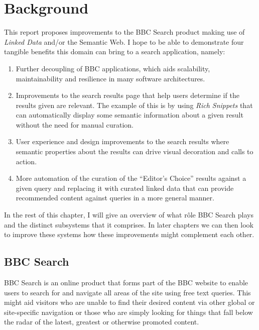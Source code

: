 \chapter{Background}
\label{intro}

This report proposes improvements to the BBC Search product making use
of \emph{Linked Data}\cite{bizer2009linked} and/or the Semantic
Web\cite{berners2001semantic}. I hope to be able to demonstrate four tangible
benefits this domain can bring to a search application, namely:

\begin{enumerate}
  \item Further decoupling of BBC applications, which aids scalability,
    maintainability and resilience in many software architectures.
  \item Improvements to the search results page that help users determine
    if the results given are relevant. The example of this is by using
    \emph{Rich Snippets}\cite{goel2009introducing}
    that can automatically display some semantic information about a given
    result without the need for manual curation.
  \item User experience and design improvements to the search results
    where semantic properties about the results can drive visual decoration
    and calls to action.
  \item More automation of the curation of the ``Editor's Choice'' results
    against a given query and replacing it with curated linked data that
    can provide recommended content against queries in a more general
    manner.
\end{enumerate}

In the rest of this chapter, I will give an overview of what r\^ole BBC
Search plays and the distinct subsystems that it comprises.
In later chapters we can then look to improve these systems
how these improvements might complement each other.

\section{BBC Search}

BBC Search is an online product that forms part of the BBC website
to enable users to search for and navigate all areas of the site using
free text queries. This might aid visitors who are unable to find their desired
content via other global or site-specific navigation or those who are simply
looking for things that fall below the radar of the latest, greatest or
otherwise promoted content.

